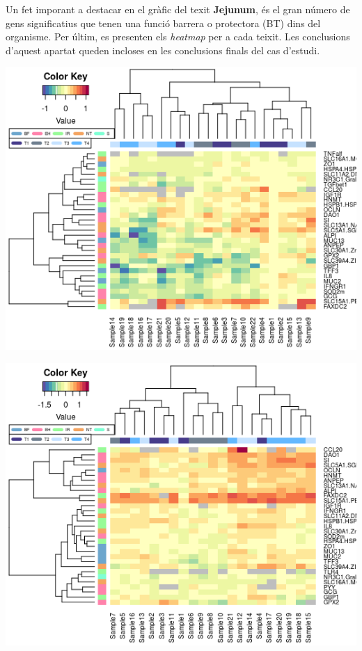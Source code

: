 \documentclass[english]{article}
\begin{document}
Un fet imporant a destacar en el gràfic del texit \textbf{Jejunum}, és el gran número de gens significatius que tenen una funció barrera o protectora (BT) dins del organisme.
\clearpage
Per últim, es presenten els \textit{heatmap} per a cada teixit. Les conclusions d'aquest apartat queden incloses en les conclusions finals del cas d'estudi.
\begin{center}
\includegraphics[scale=0.9]{heatmapi.png}
\end{center}
\begin{center}
\includegraphics[scale=0.9]{heatmapj.png}
\end{center}
\clearpage
\twocolumn
\end{document}
